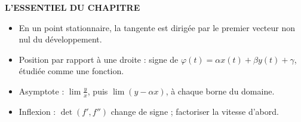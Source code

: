 \documentclass[a4paper,11pt]{article}
\numberwithin{equation}{section}
\numberwithin{figure}{section}
\numberwithin{table}{section}
\theoremstyle{enonce}
\theoremstyle{exemple}
\theoremstyle{remarque}
\newenvironment{essentiel}{\par\needspace{12\baselineskip}\vspace{1.5em}%
  \begin{tcolorbox}[enhanced,unbreakable,colback=white,colframe=white,boxrule=0pt,arc=0pt,
   borderline north={1.4pt}{0pt}{Ocre},left=2pt,right=2pt,top=8pt,bottom=4pt]
  {\sffamily\bfseries\color{Ocre}L'ESSENTIEL DU CHAPITRE}\par\medskip}{\end{tcolorbox}}
\begin{document}
\begin{essentiel}
\begin{itemize}[leftmargin=1.1em,itemsep=3pt]
\item En un point stationnaire, la tangente est dirigée par le premier vecteur non nul du développement.
\item Position par rapport à une droite : signe de $\varphi(t)=\alpha x(t)+\beta y(t)+\gamma$, étudiée comme une fonction.
\item Asymptote : $\lim\frac yx$, puis $\lim(y-\alpha x)$, à chaque borne du domaine.
\item Inflexion : $\det(f',f'')$ change de signe ; factoriser la vitesse d'abord.
\end{itemize}
\end{essentiel}
\end{document}
